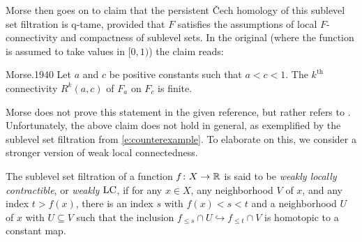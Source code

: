 Morse then goes on to claim that the persistent \v{C}ech homology of this sublevel set filtration is q-tame, provided that $F$ %
satisfies the assumptions of local $F$-connectivity and compactness of sublevel sets.
In the original (where the function is assumed to take values in $[0,1)$) the claim reads:
\begin{displaycquote}[Theorem 6.3, p.~432]{Morse.1940}
	Let $a$ and $c$ be positive constants such that $a < c < 1$.
	The $k^{\mathrm{th}}$ connectivity $R^k(a,c)$ of $F_a$ on $F_c$ is finite.
\end{displaycquote}
Morse does not prove this statement in the given reference, but rather refers to \cite[Theorem~6.1]{Morse.1938}.
Unfortunately, the above claim does not hold in general, as exemplified by the sublevel set filtration from \cref{e:counterexample}.
To elaborate on this, we consider a stronger version of weak local connectedness.

\begin{defi}
	The sublevel set filtration of a function $f \colon X \to \mathbb{R}$ is said to be \emph{weakly locally contractible}, or \emph{weakly $\mathrm{LC}$}, if for any $x \in X$, any neighborhood $V$ of $x$, and any index $t > f(x)$, there is an index $s$ with $f(x) < s < t$ and a neighborhood $U$ of $x$ with $U \subseteq V$ such that the inclusion $f_{\leq s} \cap U \hookrightarrow f_{\leq t} \cap V$ is homotopic to a constant map.
\end{defi}

